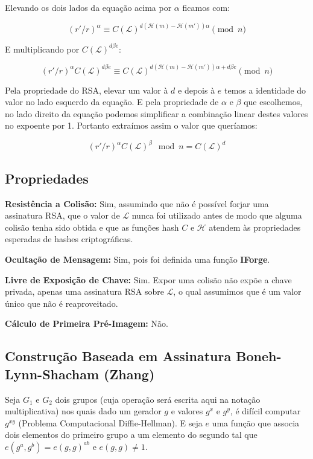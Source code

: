 \documentclass[a4paper]{article}
\begin{document}
Elevando os dois lados da equação acima por $\alpha$ ficamos com:

$$
(r'/r)^\alpha \equiv C(\mathcal{L})^{d(\mathcal{H}(m)-\mathcal{H}(m'))\alpha} \pmod n
$$

E multiplicando por $C(\mathcal{L})^{d\beta e}$:

$$
(r'/r)^\alpha C(\mathcal{L})^{d\beta e} \equiv C(\mathcal{L})^{d(\mathcal{H}(m)-\mathcal{H}(m'))\alpha + d\beta e} \pmod n
$$

Pela propriedade do RSA, elevar um valor à $d$ e depois à $e$ temos a
identidade do valor no lado esquerdo da equação. E pela propriedade de
$\alpha$ e $\beta$ que escolhemos, no lado direito da equação podemos
simplificar a combinação linear destes valores no expoente por
1. Portanto extraímos assim o valor que queríamos:

$$
(r'/r)^\alpha C(\mathcal{L})^{\beta} \mod n= C(\mathcal{L})^d
$$

\subsection{Propriedades}

\textbf{Resistência a Colisão: }Sim, assumindo que não é possível
forjar uma assinatura RSA, que o valor de $\mathcal{L}$ nunca foi
utilizado antes de modo que alguma colisão tenha sido obtida e que as
funções hash $C$ e $\mathcal{H}$ atendem às propriedades esperadas de
hashes criptográficas.

\textbf{Ocultação de Mensagem: }Sim, pois foi definida uma função
\textbf{IForge}.

\textbf{Livre de Exposição de Chave: } Sim. Expor uma colisão não
expõe a chave privada, apenas uma assinatura RSA sobre $\mathcal{L}$,
o qual assumimos que é um valor único que não é reaproveitado.
  
\textbf{Cálculo de Primeira Pré-Imagem: }Não.

\subsection{Construção Baseada em Assinatura Boneh-Lynn-Shacham (Zhang) \cite{zhang}}

Seja $G_1$ e $G_2$ dois grupos (cuja operação será escrita aqui na
notação multiplicativa) nos quais dado um gerador $g$ e valores $g^x$
e $g^y$, é difícil computar $g^{xy}$ (Problema Computacional
Diffie-Hellman). E seja $e$ uma função que associa dois elementos do
primeiro grupo a um elemento do segundo tal que $e(g^a, g^b) = e(g,
g)^{ab}$ e $e(g, g) \neq 1$.
\end{document}
